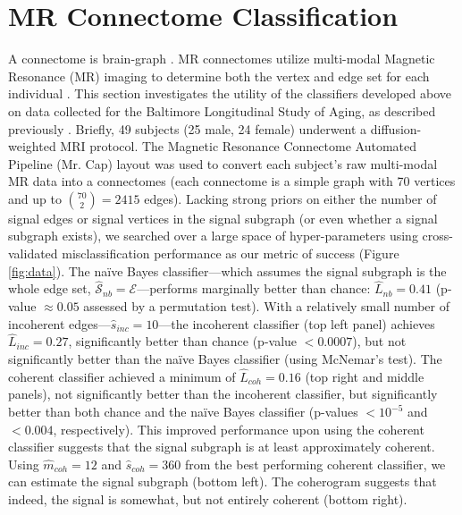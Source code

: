 \documentclass[10pt,journal,cspaper,compsoc]{IEEEtran}
\providecommand{\mc}[1]{\mathcal{#1}}
\providecommand{\mh}[1]{\hat{#1}}
\providecommand{\mhc}[1]{\hat{\mathcal{#1}}}
\begin{document}

\section{MR Connectome Classification} %
\label{sub:mr_connectome_classification}

A connectome is brain-graph \cite{Sporns2010}.  MR connectomes utilize multi-modal Magnetic Resonance (MR) imaging to determine both the vertex and edge set for each individual \cite{Hagmann2010}.  This section investigates the utility of the classifiers developed above on data collected for the Baltimore Longitudinal Study of Aging, as described previously \cite{OHBM10}.  Briefly, 49 subjects (25 male, 24 female) underwent a diffusion-weighted MRI protocol. The Magnetic Resonance Connectome Automated Pipeline (Mr. Cap) layout was used to convert each subject's raw multi-modal MR data into a connectomes \cite{BMES10} (each connectome is a simple graph with 70 vertices and up to $\binom{70}{2}=2415$ edges). Lacking strong priors on either the number of signal edges or signal vertices in the signal subgraph (or even whether a signal subgraph exists), we searched over a large space of hyper-parameters using cross-validated misclassification performance as our metric of success (Figure \ref{fig:data}).  The na\"ive Bayes classifier---which assumes the signal subgraph is the whole edge set, $\mhc{S}_{nb}=\mc{E}$---performs marginally better than chance: $\mh{L}_{nb}=0.41$ (p-value $\approx 0.05$ assessed by a permutation test).  With a relatively small number of incoherent edges---$\mh{s}_{inc}=10$---the incoherent classifier (top left panel) achieves $\mh{L}_{inc}=0.27$, significantly better than chance (p-value $<0.0007$), but not significantly better than the na\"ive Bayes classifier (using McNemar's test).  The coherent classifier achieved a minimum of $\mh{L}_{coh}=0.16$ (top right and middle panels), not significantly better than the incoherent classifier, but significantly better than both chance and the na\"ive Bayes classifier (p-values $<10^{-5}$ and $<0.004$, respectively).  This improved performance upon using the coherent classifier suggests that the signal subgraph is at least approximately coherent. Using $\mh{m}_{coh}=12$ and $\mh{s}_{coh}=360$ from the best performing coherent classifier, we can estimate the signal subgraph (bottom left).  The coherogram suggests that indeed, the signal is somewhat, but not entirely coherent (bottom right).
\end{document}
